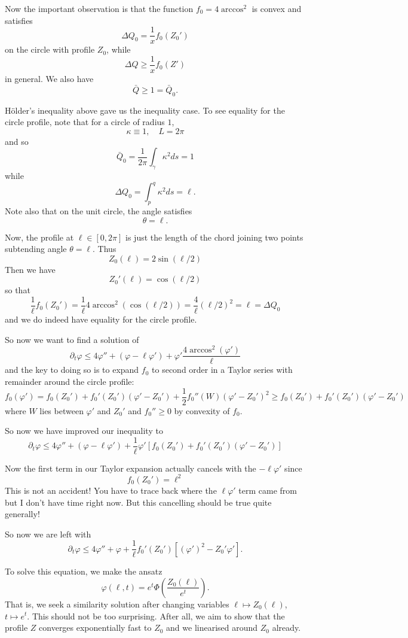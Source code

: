 \documentclass{amsart}
\begin{document}
Now the important observation is that the function \(f_0 = 4 \arccos^2\) is convex and satisfies
\[
\Delta Q_0 = \frac{1}{x} f_0(Z_0')
\]
on the circle with profile \(Z_0\), while
\[
\Delta Q \geq \frac{1}{x} f_0(Z')
\]
in general. We also have
\[
\bar{Q} \geq 1 = \bar{Q}_0.
\]

H\"older's inequality above gave us the inequality case. To see equality for the circle profile, note that for a circle of radius \(1\),
\[
\kappa \equiv 1, \quad L = 2\pi
\]
and so
\[
\bar{Q}_0 = \frac{1}{2\pi} \int_{\gamma} \kappa^2 ds = 1
\]
while
\[
\Delta Q_0 = \int_p^q \kappa^2 ds = \ell.
\]
Note also that on the unit circle, the angle satisfies
\[
\theta = \ell.
\]

Now, the profile at \(\ell \in [0, 2\pi]\) is just the length of the chord joining two points subtending angle \(\theta = \ell\). Thus
\[
Z_0(\ell) = 2 \sin(\ell/2)
\]
Then we have
\[
Z_0'(\ell) = \cos(\ell/2)
\]
so that
\[
\frac{1}{\ell} f_0(Z_0') = \frac{1}{\ell} 4 \arccos^2(\cos(\ell/2)) = \frac{4}{\ell} (\ell/2)^2 = \ell = \Delta Q_0
\]
and we do indeed have equality for the circle profile.

So now we want to find a solution of
\[
\partial_t \varphi \leq 4 \varphi'' + (\varphi - \ell \varphi') + \varphi' \frac{4\arccos^2(\varphi')}{\ell}
\]
and the key to doing so is to expand \(f_0\) to second order in a Taylor series with remainder around the circle profile:
\[
f_0(\varphi') = f_0(Z_0') + f_0'(Z_0')(\varphi' - Z_0') + \frac{1}{2} f_0''(W)(\varphi' - Z_0')^2 \geq f_0(Z_0') + f_0'(Z_0')(\varphi' - Z_0')
\]
where \(W\) lies between \(\varphi'\) and \(Z_0'\) and \(f_0''\geq 0\) by convexity of \(f_0\).

So now we have improved our inequality to
\[
\partial_t \varphi \leq 4 \varphi'' + (\varphi - \ell \varphi') + \frac{1}{\ell} \varphi' \left[f_0(Z_0') + f_0'(Z_0')(\varphi' - Z_0')\right]
\]

Now the first term in our Taylor expansion actually cancels with the \(-\ell\varphi'\) since
\[
f_0(Z_0') = \ell^2
\]
This is not an accident! You have to trace back where the \(\ell\varphi'\) term came from but I don't have time right now. But this cancelling should be true quite generally!

So now we are left with
\[
\partial_t \varphi \leq 4 \varphi'' + \varphi + \frac{1}{\ell} f_0'(Z_0')[(\varphi')^2 - Z_0'\varphi'].
\]

To solve this equation, we make the ansatz
\[
\varphi(\ell, t) = e^t \Phi\left(\frac{Z_0(\ell)}{e^t}\right).
\]
That is, we seek a similarity solution after changing variables \(\ell \mapsto Z_0(\ell)\), \(t \mapsto e^t\). This should not be too surprising. After all, we aim to show that the profile \(Z\) converges exponentially fast to \(Z_0\) and we linearised around \(Z_0\) already.
\end{document}
